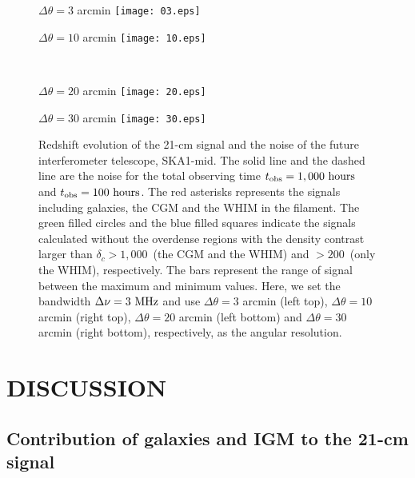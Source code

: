 \documentclass[a4paper,fleqn,usenatbib,useAMS]{mnras}
\begin{document}
\begin{figure*}
  \begin{minipage}[b]{0.45\textwidth}
\centering
$\Delta \theta = 3$ arcmin
\texttt{[image: 03.eps]}
  \end{minipage}
  \begin{minipage}[b]{0.45\textwidth}
 \centering
$\Delta \theta = 10$ arcmin
 \texttt{[image: 10.eps]}
  \end{minipage}\\
  \begin{minipage}[b]{0.45\textwidth}
 \centering
$\Delta \theta = 20$ arcmin
 \texttt{[image: 20.eps]}
  \end{minipage}
  \begin{minipage}[b]{0.45\textwidth}
 \centering
$\Delta \theta = 30$ arcmin
 \texttt{[image: 30.eps]}
  \end{minipage}
  \caption{Redshift evolution of the 21-cm signal and the noise
 of the future interferometer telescope, SKA1-mid. The solid line and
 the dashed line are the noise for the total observing time
 $t_{\rm{obs}} = 1,000~\rm{hours}$ and $t_{\rm{obs}} = 100~\rm{hours}$.
The red asterisks represents the signals including galaxies, the CGM and the
 WHIM in the filament. 
 The green filled circles and the blue filled squares indicate the signals
 calculated without the overdense regions with the density
 contrast larger than $\delta_c>1,000$~(the CGM and the WHIM) and
 $>200$~(only the WHIM), respectively. 
 The bars represent the range of signal between the maximum and minimum values.
 Here, we set the bandwidth $\Delta \nu = 3~\rm{MHz}$ and use $\Delta \theta = 3$ arcmin (left top), $\Delta \theta = 10$ arcmin (right top), $\Delta \theta = 20$ arcmin (left bottom) and $\Delta \theta = 30$ arcmin (right bottom), respectively, as the angular resolution. }
 \label{fig:angreso}
 \end{figure*}

\section{DISCUSSION}\label{DISCUSSION}

\subsection{Contribution of galaxies and IGM to the 21-cm signal}
\end{document}
